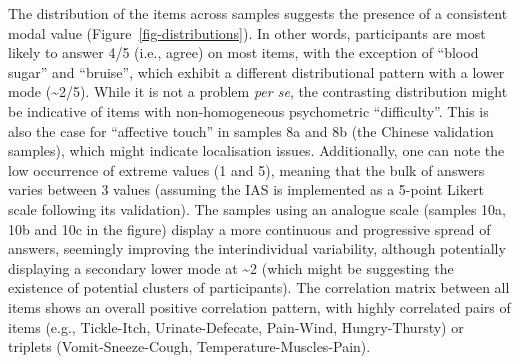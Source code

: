 \documentclass[
  jou,
  floatsintext,
  longtable,
  nolmodern,
  notxfonts,
  notimes,
  colorlinks=true,linkcolor=blue,citecolor=blue,urlcolor=blue]{apa7}
\begin{document}
The distribution of the items across samples suggests the presence of a
consistent modal value (Figure~\ref{fig-distributions}). In other words,
participants are most likely to answer 4/5 (i.e., agree) on most items,
with the exception of ``blood sugar'' and ``bruise'', which exhibit a
different distributional pattern with a lower mode (\textasciitilde2/5).
While it is not a problem \emph{per se}, the contrasting distribution
might be indicative of items with non-homogeneous psychometric
``difficulty''. This is also the case for ``affective touch'' in samples
8a and 8b (the Chinese validation samples), which might indicate
localisation issues. Additionally, one can note the low occurrence of
extreme values (1 and 5), meaning that the bulk of answers varies
between 3 values (assuming the IAS is implemented as a 5-point Likert
scale following its validation). The samples using an analogue scale
(samples 10a, 10b and 10c in the figure) display a more continuous and
progressive spread of answers, seemingly improving the interindividual
variability, although potentially displaying a secondary lower mode at
\textasciitilde2 (which might be suggesting the existence of potential
clusters of participants). The correlation matrix between all items
shows an overall positive correlation pattern, with highly correlated
pairs of items (e.g., Tickle-Itch, Urinate-Defecate, Pain-Wind,
Hungry-Thursty) or triplets (Vomit-Sneeze-Cough,
Temperature-Muscles-Pain).
\end{document}
